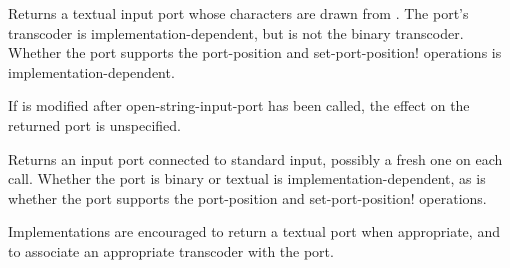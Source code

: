 \begin{entry}{%
}

Returns a textual input port whose characters are drawn from
.  The port's transcoder is implementation-dependent,
but is not the binary transcoder.
Whether the port supports
the {\cf port-position} and {\cf set-port-position!} operations
is implementation-dependent.

If  is modified after {\cf open-string-input-port}
has been called, the effect on the returned port is unspecified.
\end{entry}

\begin{entry}{%
}
   
Returns an input port connected to standard input, possibly a fresh
one on each call.
Whether the port is binary or textual is implementation-dependent,
as is whether the port supports
the {\cf port-position} and {\cf set-port-position!} operations.

\begin{note}
  Implementations are encouraged to return a textual port when
  appropriate, and
  to associate an appropriate transcoder with the port.
\end{note}
\end{entry}

